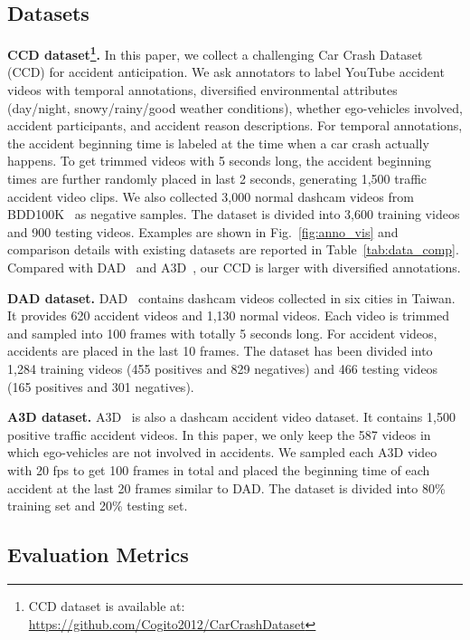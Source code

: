 \documentclass[sigconf]{acmart}
\begin{document}
\subsection{Datasets}

\textbf{CCD dataset\footnote{CCD dataset is available at: \url{https://github.com/Cogito2012/CarCrashDataset}}.} In this paper, we collect a challenging Car Crash Dataset (CCD) for accident anticipation. We ask annotators to label YouTube accident videos with temporal annotations, diversified environmental attributes (day/night, snowy/rainy/good weather conditions), whether ego-vehicles involved, accident participants, and accident reason descriptions. For temporal annotations, the accident beginning time is labeled at the time when a car crash actually happens. To get trimmed videos with 5 seconds long, the accident beginning times are further randomly placed in last 2 seconds, generating 1,500 traffic accident video clips. We also collected 3,000 normal dashcam videos from BDD100K~\cite{YuCVPR2020} as negative samples. The dataset is divided into 3,600 training videos and 900 testing videos. Examples are shown in Fig.~\ref{fig:anno_vis} and comparison details with existing datasets are reported in Table~\ref{tab:data_comp}. Compared with DAD~\cite{ChanACCV2016} and A3D~\cite{YaoIROS2019}, our CCD is larger with diversified annotations.

\textbf{DAD dataset.} DAD~\cite{ChanACCV2016} contains dashcam videos collected in six cities in Taiwan. It provides 620 accident videos and 1,130 normal videos. Each video is trimmed and sampled into 100 frames with totally 5 seconds long. For accident videos, accidents are placed in the last 10 frames. The dataset has been divided into 1,284 training videos (455 positives and 829 negatives) and 466 testing videos (165 positives and 301 negatives).

\textbf{A3D dataset.} A3D~\cite{YaoIROS2019} is also a dashcam accident video dataset. It contains 1,500 positive traffic accident videos. In this paper, we only keep the 587 videos in which ego-vehicles are not involved in accidents. We sampled each A3D video with 20 fps to get 100 frames in total and placed the beginning time of each accident at the last 20 frames similar to DAD. The dataset is divided into 80\% training set and 20\% testing set.


\subsection{Evaluation Metrics}
\label{sec:eval}
\end{document}
